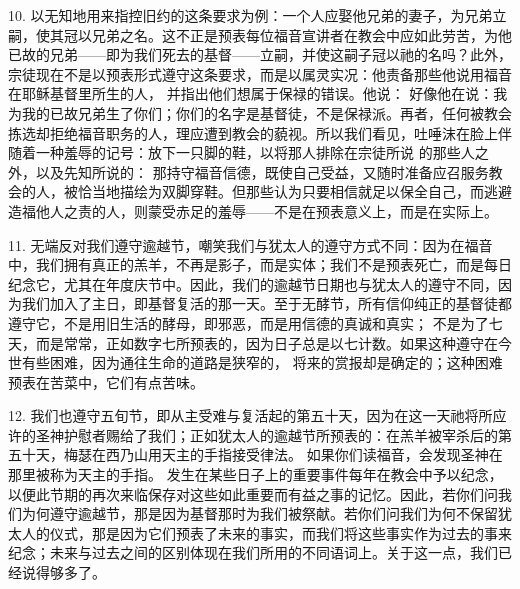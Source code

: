 10. 以无知地用来指控旧约的这条要求为例：一个人应娶他兄弟的妻子，为兄弟立嗣，使其冠以兄弟之名。这不正是预表每位福音宣讲者在教会中应如此劳苦，为他已故的兄弟——即为我们死去的基督——立嗣，并使这嗣子冠以祂的名吗？此外，宗徒现在不是以预表形式遵守这条要求，而是以属灵实况：他责备那些他说用福音在耶稣基督里所生的人， 并指出他们想属于保禄的错误。他说： 好像他在说：我为我的已故兄弟生了你们；你们的名字是基督徒，不是保禄派。再者，任何被教会拣选却拒绝福音职务的人，理应遭到教会的藐视。所以我们看见，吐唾沫在脸上伴随着一种羞辱的记号：放下一只脚的鞋，以将那人排除在宗徒所说 的那些人之外，以及先知所说的： 那持守福音信德，既使自己受益，又随时准备应召服务教会的人，被恰当地描绘为双脚穿鞋。但那些认为只要相信就足以保全自己，而逃避造福他人之责的人，则蒙受赤足的羞辱——不是在预表意义上，而是在实际上。\par

11. 无端反对我们遵守逾越节，嘲笑我们与犹太人的遵守方式不同：因为在福音中，我们拥有真正的羔羊，不再是影子，而是实体；我们不是预表死亡，而是每日纪念它，尤其在年度庆节中。因此，我们的逾越节日期也与犹太人的遵守不同，因为我们加入了主日，即基督复活的那一天。至于无酵节，所有信仰纯正的基督徒都遵守它，不是用旧生活的酵母，即邪恶，而是用信德的真诚和真实； 不是为了七天，而是常常，正如数字七所预表的，因为日子总是以七计数。如果这种遵守在今世有些困难，因为通往生命的道路是狭窄的， 将来的赏报却是确定的；这种困难预表在苦菜中，它们有点苦味。\par

12. 我们也遵守五旬节，即从主受难与复活起的第五十天，因为在这一天祂将所应许的圣神护慰者赐给了我们；正如犹太人的逾越节所预表的：在羔羊被宰杀后的第五十天，梅瑟在西乃山用天主的手指接受律法。 如果你们读福音，会发现圣神在那里被称为天主的手指。 发生在某些日子上的重要事件每年在教会中予以纪念，以便此节期的再次来临保存对这些如此重要而有益之事的记忆。因此，若你们问我们为何遵守逾越节，那是因为基督那时为我们被祭献。若你们问我们为何不保留犹太人的仪式，那是因为它们预表了未来的事实，而我们将这些事实作为过去的事来纪念；未来与过去之间的区别体现在我们所用的不同语词上。关于这一点，我们已经说得够多了。\par

